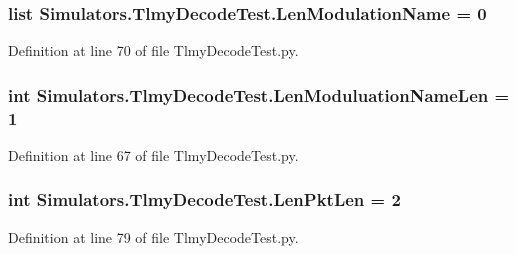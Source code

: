 \hypertarget{namespace_simulators_1_1_tlmy_decode_test_a45b3f41290d20a389265bc221465fd8e}{}
\subsubsection[{Len\+Modulation\+Name}]{\setlength{\rightskip}{0pt plus 5cm}list Simulators.\+Tlmy\+Decode\+Test.\+Len\+Modulation\+Name = 0}\label{namespace_simulators_1_1_tlmy_decode_test_a45b3f41290d20a389265bc221465fd8e}


Definition at line 70 of file Tlmy\+Decode\+Test.\+py.

\hypertarget{namespace_simulators_1_1_tlmy_decode_test_aa9a9512971a5a5001fed85a4fb6b709f}{}
\subsubsection[{Len\+Moduluation\+Name\+Len}]{\setlength{\rightskip}{0pt plus 5cm}int Simulators.\+Tlmy\+Decode\+Test.\+Len\+Moduluation\+Name\+Len = 1}\label{namespace_simulators_1_1_tlmy_decode_test_aa9a9512971a5a5001fed85a4fb6b709f}


Definition at line 67 of file Tlmy\+Decode\+Test.\+py.

\hypertarget{namespace_simulators_1_1_tlmy_decode_test_abab63bf6dbfbf6a71ab527e95bf6c55f}{}
\subsubsection[{Len\+Pkt\+Len}]{\setlength{\rightskip}{0pt plus 5cm}int Simulators.\+Tlmy\+Decode\+Test.\+Len\+Pkt\+Len = 2}\label{namespace_simulators_1_1_tlmy_decode_test_abab63bf6dbfbf6a71ab527e95bf6c55f}


Definition at line 79 of file Tlmy\+Decode\+Test.\+py.

\hypertarget{namespace_simulators_1_1_tlmy_decode_test_a4230750d2f14e6c0b61c49139afea479}{}
